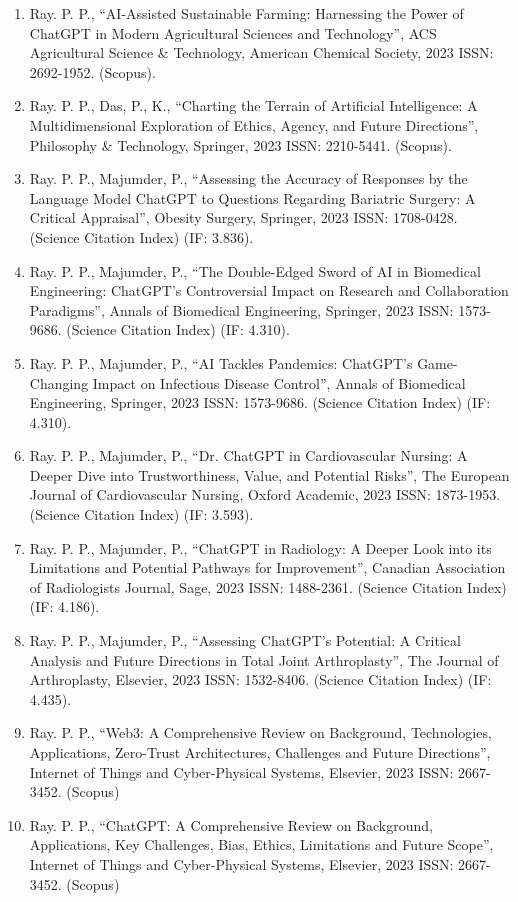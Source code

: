 \documentclass[11pt,a4paper]{moderncv}
\begin{document}
\begin{adjustwidth}{6em}{0pt}
\begin{enumerate}
		\item Ray. P. P., “AI-Assisted Sustainable Farming: Harnessing the Power of ChatGPT in Modern Agricultural Sciences and Technology”, ACS Agricultural Science \& Technology, American Chemical Society, 2023 ISSN: 2692-1952. (Scopus).
		\item Ray. P. P., Das, P., K., “Charting the Terrain of Artificial Intelligence: A Multidimensional Exploration of Ethics, Agency, and Future Directions”, Philosophy \& Technology, Springer, 2023 ISSN: 2210-5441. (Scopus).
		\item Ray. P. P., Majumder, P., “Assessing the Accuracy of Responses by the Language Model ChatGPT to Questions Regarding Bariatric Surgery: A Critical Appraisal”, Obesity Surgery, Springer, 2023 ISSN: 1708-0428. (Science Citation Index) (IF: 3.836).
		\item Ray. P. P., Majumder, P., “The Double-Edged Sword of AI in Biomedical Engineering: ChatGPT's Controversial Impact on Research and Collaboration Paradigms”, Annals of Biomedical Engineering, Springer, 2023 ISSN: 1573-9686. (Science Citation Index) (IF: 4.310).
		\item Ray. P. P., Majumder, P., “AI Tackles Pandemics: ChatGPT's Game-Changing Impact on Infectious Disease Control”, Annals of Biomedical Engineering, Springer, 2023 ISSN: 1573-9686. (Science Citation Index) (IF: 4.310).
		\item Ray. P. P., Majumder, P., “Dr. ChatGPT in Cardiovascular Nursing: A Deeper Dive into Trustworthiness, Value, and Potential Risks”, The European Journal of Cardiovascular Nursing, Oxford Academic, 2023 ISSN: 1873-1953. (Science Citation Index) (IF: 3.593).
		\item Ray. P. P., Majumder, P., “ChatGPT in Radiology: A Deeper Look into its Limitations and Potential Pathways for Improvement”, Canadian Association of Radiologists Journal, Sage, 2023 ISSN: 1488-2361. (Science Citation Index) (IF: 4.186).
		\item Ray. P. P., Majumder, P., “Assessing ChatGPT's Potential: A Critical Analysis and Future Directions in Total Joint Arthroplasty”, The Journal of Arthroplasty, Elsevier, 2023 ISSN: 1532-8406. (Science Citation Index) (IF: 4.435).
		\item Ray. P. P., “Web3: A Comprehensive Review on Background, Technologies, Applications, Zero-Trust Architectures, Challenges and Future Directions”, Internet of Things and Cyber-Physical Systems, Elsevier, 2023 ISSN: 2667-3452. (Scopus)
		\item Ray. P. P., “ChatGPT: A Comprehensive Review on Background, Applications, Key Challenges, Bias, Ethics, Limitations and Future Scope”, Internet of Things and Cyber-Physical Systems, Elsevier, 2023 ISSN: 2667-3452. (Scopus)

\end{enumerate}
\end{adjustwidth}
\end{document}

